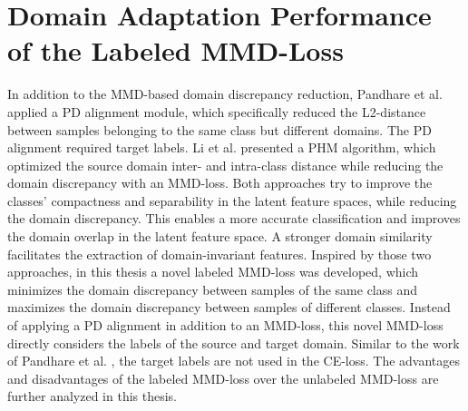 \section{Domain Adaptation Performance of the Labeled MMD-Loss}
In addition to the MMD-based domain discrepancy reduction, Pandhare et al. \cite{Pandhare2021} applied a PD alignment module, which specifically reduced the L2-distance between samples belonging to the same class but different domains. The PD alignment required target labels. Li et al. \cite{Li2018} presented a PHM algorithm, which optimized the source domain inter- and intra-class distance while reducing the domain discrepancy with an MMD-loss. Both approaches try to improve the classes' compactness and separability in the latent feature spaces, while reducing the domain discrepancy. This enables a more accurate classification and improves the domain overlap in the latent feature space. A stronger domain similarity facilitates the extraction of domain-invariant features. Inspired by those two approaches, in this thesis a novel labeled MMD-loss was developed, which minimizes the domain discrepancy between samples of the same class and maximizes the domain discrepancy between samples of different classes. Instead of applying a PD alignment in addition to an MMD-loss, this novel MMD-loss directly considers the labels of the source and target domain. Similar to the work of Pandhare et al. \cite{Pandhare2021}, the target labels are not used in the CE-loss. The advantages and disadvantages of the labeled MMD-loss over the unlabeled MMD-loss are further analyzed in this thesis.

